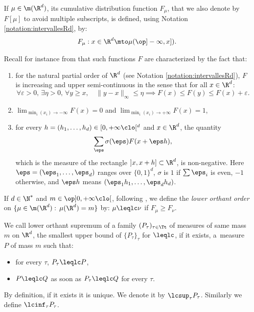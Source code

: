 \begin{defi}\label{def:cumul}
If $\mu\in\m(\R^d)$, its cumulative distribution function $F_\mu$, that we also denote by $F[\mu]$ to avoid multiple subscripts, is defined, using Notation \ref{notation:intervallesRd}, by:
\[F_\mu:x\in\R^d\mto\mu(\op]-\infty,x]).\]
\end{defi}

\begin{reminder}\label{remind:F}
Recall for instance from \cite[Th.\,3.25]{Kal} that such functions $F$ are characterized by the fact that:
\begin{enumerate}
\item
\label{item:Fonctions_partielles} for the natural partial order of $\R^d$ (see Notation \ref{notation:intervallesRd}), $F$ is increasing and upper semi-continuous in the sense that for all $x\in\R^d$:
\begin{equation}\label{eq:usc}
\forall\varepsilon>0,\,\exists\eta>0,\,\forall y\geqslant x,\quad \|y-x\|_\infty\leqslant\eta\implies F(x)\leqslant F(y)\leqslant F(x)+\varepsilon.
\end{equation}

\item
\label{item:Flimite} $\lim_{\min_i(x_i)\to-\infty} F(x)=0$ and $\lim_{\min_i(x_i)\to+\infty} F(x)=1$,

\item
\label{item:Fdifferences_croisees} for every $h=(h_1,\ldots,h_d)\in[0,+\infty\clo[^d$ and $x
\in \R^d$, the quantity
\[
\sum_{\eps} \sigma(\eps) F(x+\eps h),
\]
which is the measure of the rectangle $]x,x+h]\subset \R^d$, is non-negative. Here $\eps=(\eps_1,\ldots,\eps_d)$ ranges over $\{0,1\}^d$, $\sigma$ is $1$ if $\sum \eps_i$ is even, $-1$ otherwise, and $\eps h$ means $(\eps_1h_1,\ldots,\eps_dh_d)$.
\end{enumerate}
\end{reminder}

\begin{defi}\label{defi:geqlc} If $d\in\N^\ast$ and $m\in\op]0,+\infty\clo[$, following \cite[\S 6.G]{SS}, we define the \emph{lower orthant order} on $\{\mu\in\m(\R^d):\,\mu(\R^d)=m\}$ by: $\mu\leqlc\nu$ if $F_\mu\geqslant F_\nu$.
\end{defi}

\begin{defi}\label{def:lcsup}We call lower orthant supremum of a family $(P_\tau)_{\tau\in\Tt}$ of measures of same mass $m$ on $\R^d$, the smallest upper bound of $\{P_\tau\} _\tau$ for $\leqlc$, if it exists, \ie a~measure $P$ of mass $m$ such that:
\begin{itemize}
\item
for every $\tau$, $P_\tau\leqlc P$,
\item
$P\leqlc Q$ as soon as $P_\tau\leqlc Q$ for every $\tau$.
\end{itemize}
By definition, if it exists it is unique. We denote it by $\lcsup_\tau P_\tau$. Similarly we define $\lcinf_\tau P_\tau$.
\end{defi}

